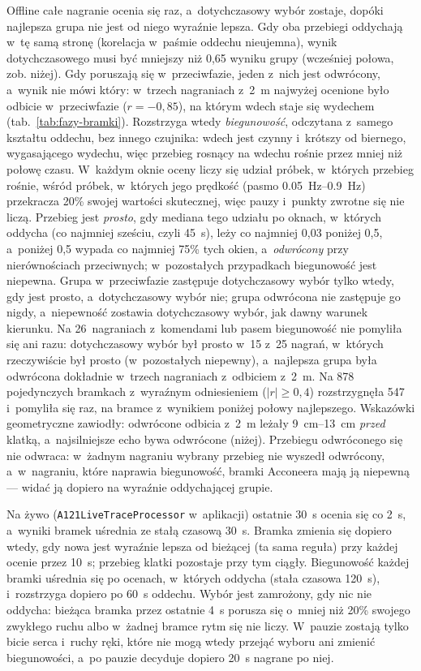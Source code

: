 \documentclass[12pt,a4paper,oneside]{report}
\begin{document}
Offline całe nagranie ocenia się raz, a~dotychczasowy wybór zostaje, dopóki
najlepsza grupa nie jest od niego wyraźnie lepsza. Gdy oba przebiegi
oddychają w~tę samą stronę (korelacja w~paśmie oddechu nieujemna), wynik
dotychczasowego musi być mniejszy niż 0,65 wyniku grupy (wcześniej połowa, zob.
niżej). Gdy poruszają się
w~przeciwfazie, jeden z~nich jest odwrócony, a~wynik nie mówi który:
w~trzech nagraniach z~\SI{2}{m} najwyżej ocenione było odbicie
w~przeciwfazie ($r=-0{,}85$), na którym wdech staje się wydechem
(tab.~\ref{tab:fazy-bramki}). Rozstrzyga wtedy \emph{biegunowość}, odczytana
z~samego kształtu oddechu, bez innego czujnika: wdech jest czynny i~krótszy
od biernego, wygasającego wydechu, więc przebieg rosnący na wdechu rośnie
przez mniej niż połowę czasu. W~każdym oknie oceny liczy się udział próbek,
w~których przebieg rośnie, wśród próbek, w~których jego prędkość (pasmo
\SIrange{0.05}{0.9}{Hz}) przekracza 20\% swojej wartości skutecznej, więc
pauzy i~punkty zwrotne się nie liczą. Przebieg jest \emph{prosto}, gdy
mediana tego udziału po oknach, w~których oddycha (co najmniej sześciu, czyli
\SI{45}{s}), leży co najmniej 0,03 poniżej 0,5, a~poniżej 0,5 wypada co
najmniej 75\% tych okien, a~\emph{odwrócony} przy nierównościach
przeciwnych; w~pozostałych przypadkach biegunowość jest niepewna. Grupa
w~przeciwfazie zastępuje dotychczasowy wybór tylko wtedy, gdy jest prosto,
a~dotychczasowy wybór nie; grupa odwrócona nie zastępuje go nigdy,
a~niepewność zostawia dotychczasowy wybór, jak dawny warunek kierunku. Na
26~nagraniach z~komendami lub pasem biegunowość nie pomyliła się ani razu:
dotychczasowy wybór był prosto w~15 z~25 nagrań, w~których rzeczywiście był
prosto (w~pozostałych niepewny), a~najlepsza grupa była odwrócona dokładnie
w~trzech nagraniach z~odbiciem z~\SI{2}{m}. Na 878 pojedynczych bramkach
z~wyraźnym odniesieniem ($|r| \ge 0{,}4$) rozstrzygnęła 547 i~pomyliła się
raz, na bramce z~wynikiem poniżej połowy najlepszego. Wskazówki geometryczne
zawiodły: odwrócone odbicia z~\SI{2}{m} leżały
\SIrange{9}{13}{cm} \emph{przed} klatką, a~najsilniejsze echo bywa
odwrócone (niżej). Przebiegu odwróconego się nie odwraca: w~żadnym nagraniu
wybrany przebieg nie wyszedł odwrócony, a~w~nagraniu, które naprawia
biegunowość, bramki Acconeera mają ją niepewną --- widać ją dopiero na
wyraźnie oddychającej grupie.

Na żywo (\texttt{A121LiveTraceProcessor}
w~aplikacji) ostatnie \SI{30}{s} ocenia się co \SI{2}{s}, a~wyniki bramek
uśrednia ze stałą czasową \SI{30}{s}. Bramka zmienia się dopiero wtedy, gdy
nowa jest wyraźnie lepsza od bieżącej (ta sama reguła) przy każdej ocenie przez
\SI{10}{s}; przebieg klatki pozostaje przy tym ciągły. Biegunowość każdej
bramki uśrednia się po ocenach, w~których oddycha (stała czasowa
\SI{120}{s}), i~rozstrzyga dopiero po \SI{60}{s} oddechu. Wybór jest
zamrożony, gdy nic nie oddycha: bieżąca bramka przez ostatnie \SI{4}{s}
porusza się o~mniej niż 20\% swojego zwykłego ruchu albo w~żadnej bramce rytm
się nie liczy. W~pauzie zostają tylko bicie serca i~ruchy ręki, które nie mogą
wtedy przejąć wyboru ani zmienić biegunowości, a~po pauzie decyduje dopiero
\SI{20}{s} nagrane po niej.
\end{document}
